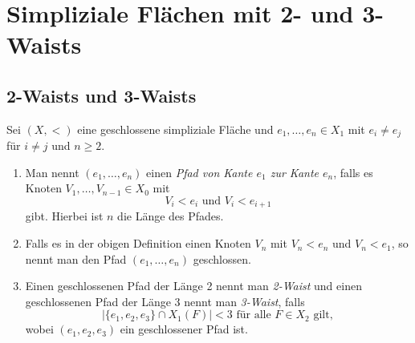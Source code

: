 \documentclass[12pt,titlepage]{article}
\begin{document}
\section{Simpliziale Flächen mit 2- und 3-Waists}
\subsection{2-Waists und 3-Waists }
\begin{definition}
Sei $(X,<)$ eine geschlossene simpliziale Fläche und $e_1,\ldots,e_n\in X_1$ mit $ e_i \neq e_j$ für $i \neq j$ und $n \geq 2$.
\begin{enumerate}
\item   Man nennt $(e_1,\ldots,e_n)$ einen \emph{Pfad von Kante $e_1$ zur Kante $e_n$}, falls es Knoten $V_1,\ldots,V_{n-1}\in X_0$ mit 
\[
V_i<e_i \text{ und } V_i<e_{i+1}
\] 
gibt.
Hierbei ist $n$ die Länge des Pfades.
\item Falls es in der obigen Definition einen Knoten $V_n$ mit $V_n<e_n$ und $V_n<e_1$, so nennt man den Pfad $(e_1,\ldots,e_n)$ geschlossen.
\item Einen geschlossenen Pfad der Länge 2 nennt man \emph{2-Waist} und einen geschlossenen Pfad der Länge 3 nennt man \emph{3-Waist}, falls 
\[
\vert \{e_1,e_2,e_3\}\cap X_1(F) \vert< 3\text{ für alle } F \in X_2 \text{ gilt},
\]
wobei $(e_1,e_2,e_3)$ ein geschlossener Pfad ist.
\end{enumerate}
\end{definition}
\end{document}
